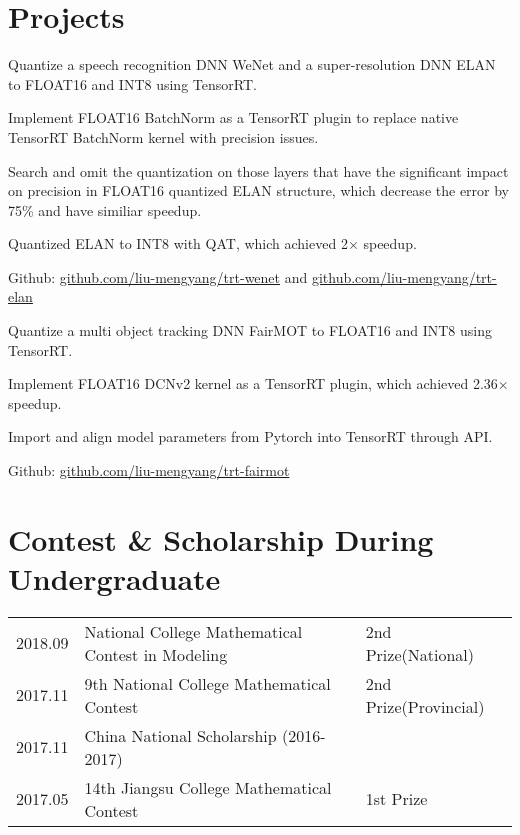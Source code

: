 \documentclass[]{deedy-resume-openfont}
\begin{document}
\begin{minipage}[t]{0.77\textwidth}
\section{Projects}
\begin{tightemize}
    \item Quantize a speech recognition DNN WeNet and a super-resolution DNN ELAN to FLOAT16 and INT8 using TensorRT.
    \item Implement FLOAT16 BatchNorm as a TensorRT plugin to replace native TensorRT BatchNorm kernel with precision issues.
    \item Search and omit the quantization on those layers that have the significant impact on precision in FLOAT16 quantized ELAN structure, which decrease the error by 75\% and have similiar speedup.
    \item Quantized ELAN to INT8 with QAT, which achieved 2$\times$ speedup.
    \item Github: \href{https://github.com/liu-mengyang/trt-wenet}{github.com/liu-mengyang/trt-wenet} and \href{https://github.com/liu-mengyang/trt-elan}{github.com/liu-mengyang/trt-elan}
\end{tightemize}
\sectionsep

\begin{tightemize}
    \item Quantize a multi object tracking DNN FairMOT to FLOAT16 and INT8 using TensorRT.
    \item Implement FLOAT16 DCNv2 kernel as a TensorRT plugin, which achieved 2.36$\times$ speedup.
    \item Import and align model parameters from Pytorch into TensorRT through API.
    \item Github: \href{https://github.com/liu-mengyang/trt-fairmot}{github.com/liu-mengyang/trt-fairmot}
\end{tightemize}
\sectionsep

\section{Contest \& Scholarship During Undergraduate} 
\begin{tabular}{lll}
    2018.09 & National College Mathematical Contest in Modeling & 2nd Prize(National) \\
    2017.11 & 9th National College Mathematical Contest & 2nd Prize(Provincial) \\
    2017.11 & China National Scholarship (2016-2017) & \\
    2017.05 & 14th Jiangsu College Mathematical Contest & 1st Prize\\
\end{tabular}
\sectionsep

\end{minipage} 
\end{document}
